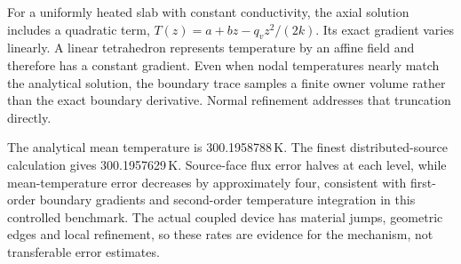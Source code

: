 \documentclass[11pt,a4paper]{article}
\begin{document}
For a uniformly heated slab with constant conductivity, the axial solution includes a quadratic term, $T(z)=a+bz-q_vz^2/(2k)$. Its exact gradient varies linearly. A linear tetrahedron represents temperature by an affine field and therefore has a constant gradient. Even when nodal temperatures nearly match the analytical solution, the boundary trace samples a finite owner volume rather than the exact boundary derivative. Normal refinement addresses that truncation directly.

The analytical mean temperature is 300.1958788\,K. The finest distributed-source calculation gives 300.1957629\,K. Source-face flux error halves at each level, while mean-temperature error decreases by approximately four, consistent with first-order boundary gradients and second-order temperature integration in this controlled benchmark. The actual coupled device has material jumps, geometric edges and local refinement, so these rates are evidence for the mechanism, not transferable error estimates.

\clearpage
\end{document}
